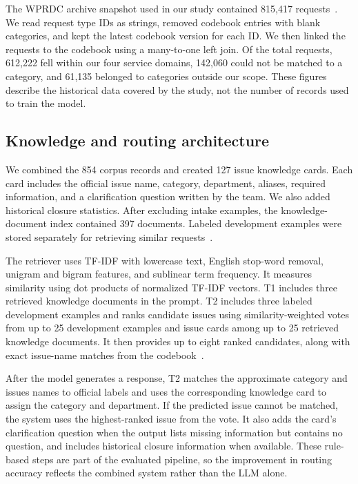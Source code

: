 \documentclass[11pt,letterpaper]{article}
\begin{document}
The WPRDC archive snapshot used in our study contained 815,417 requests~\cite{team,archive}. We read request type IDs as strings, removed codebook entries with blank categories, and kept the latest codebook version for each ID. We then linked the requests to the codebook using a many-to-one left join. Of the total requests, 612,222 fell within our four service domains, 142,060 could not be matched to a category, and 61,135 belonged to categories outside our scope. These figures describe the historical data covered by the study, not the number of records used to train the model.

\subsection{Knowledge and routing architecture}

We combined the 854 corpus records and created 127 issue knowledge cards. Each card includes the official issue name, category, department, aliases, required information, and a clarification question written by the team. We also added historical closure statistics. After excluding intake examples, the knowledge-document index contained 397 documents. Labeled development examples were stored separately for retrieving similar requests~\cite{team}.

The retriever uses TF-IDF with lowercase text, English stop-word removal, unigram and bigram features, and sublinear term frequency. It measures similarity using dot products of normalized TF-IDF vectors. T1 includes three retrieved knowledge documents in the prompt. T2 includes three labeled development examples and ranks candidate issues using similarity-weighted votes from up to 25 development examples and issue cards among up to 25 retrieved knowledge documents. It then provides up to eight ranked candidates, along with exact issue-name matches from the codebook~\cite{team}.

After the model generates a response, T2 matches the approximate category and issues names to official labels and uses the corresponding knowledge card to assign the category and department. If the predicted issue cannot be matched, the system uses the highest-ranked issue from the vote. It also adds the card's clarification question when the output lists missing information but contains no question, and includes historical closure information when available. These rule-based steps are part of the evaluated pipeline, so the improvement in routing accuracy reflects the combined system rather than the LLM alone.
\end{document}
